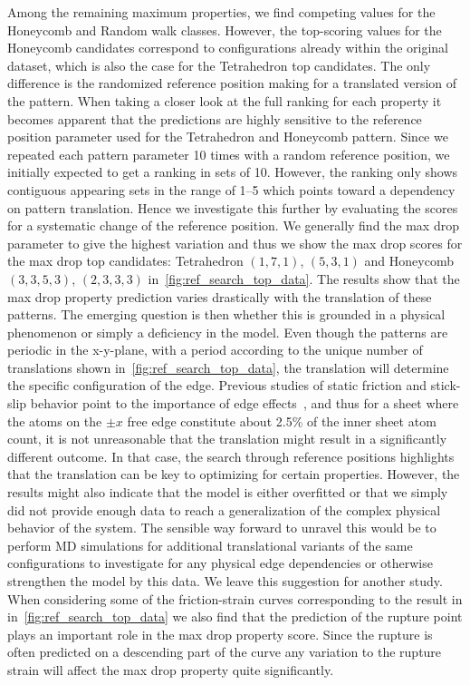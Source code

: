 Among the remaining maximum properties, we find competing values for the
Honeycomb and Random walk classes. However, the top-scoring values for the
Honeycomb candidates correspond to configurations already within the original
dataset, which is also the case for the Tetrahedron top candidates. The only
difference is the randomized reference position making for a translated version
of the pattern. When taking a closer look at the full ranking for each property
it becomes apparent that the predictions are highly sensitive to the reference
position parameter used for the Tetrahedron and Honeycomb pattern. Since we
repeated each pattern parameter 10 times with a random reference position, we
initially expected to get a ranking in sets of 10. However, the ranking only
shows contiguous appearing sets in the range of 1--5 which points toward a
dependency on pattern translation. Hence we investigate this further by
evaluating the scores for a systematic change of the reference position. We
generally find the max drop parameter to give the highest variation and thus we
show the max drop scores for the max drop top candidates: Tetrahedron $(1,7,1)$,
$(5,3,1)$ and Honeycomb $(3,3,5,3)$, $(2,3,3,3)$
in~\cref{fig:ref_search_top_data}. The results show that the max drop property prediction varies drastically with the translation of these patterns. The emerging question is
then whether this is grounded in a physical phenomenon or simply a
deficiency in the model. Even though the patterns are periodic in the
x-y-plane, with a period according to the unique number of translations shown in~\cref{fig:ref_search_top_data}, the translation will determine the specific
configuration of the edge. Previous studies of static friction and stick-slip
behavior point to the importance of edge effects~\cite{Varini_2015}, and thus for a sheet where the atoms on the $\pm x$ free
edge constitute about 2.5\% of the inner sheet atom count, it is not
unreasonable that the translation might result in a significantly different
outcome. In that case, the search through reference positions highlights that
the translation can be key to optimizing for certain properties. However, the
results might also indicate that the model is either overfitted or that we
simply did not provide enough data to reach a generalization of the complex
physical behavior of the system. The sensible way forward to unravel this would
be to perform \acrshort{MD} simulations for additional translational variants of the same configurations to
investigate for any physical edge dependencies or otherwise strengthen the
model by this data. We leave this suggestion for another study. When considering some of the friction-strain curves corresponding to the result in in~\cref{fig:ref_search_top_data} we also find that the prediction of the rupture point plays an important role in the max drop property score. Since the rupture is often predicted on a descending part of the curve any variation to the rupture strain will affect the max drop property quite significantly.


